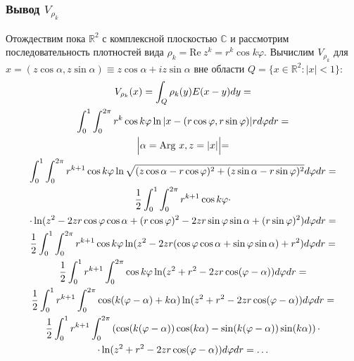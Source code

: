 \documentclass[a4paper]{article}
\newcommand{\R}[1]{\mathbb{R}^#1}
\begin{document}
  \subsubsection{Вывод $V_{\rho_k}$}
  Отождествим пока $\R{2}$ с комплексной плоскостью $\mathbb{C}$ и рассмотрим последовательность плотностей вида $\rho_k=\text{Re}\ z^k=r^k \cos k\varphi$.
  Вычислим $V_{\rho_k}$ для $x=(z \cos\alpha,z \sin \alpha) \equiv z \cos\alpha + i z \sin \alpha$ вне области $Q= \{x \in \R{2}: |x|<1 \}$:
\begin{multline}
  V_{\rho_k}(x)= \int_Q \rho_k(y) E(x-y) dy= \\
  \int_0^1 \int_0^{2 \pi} r^k \cos k\varphi \ln |x-(r \cos \varphi, r \sin\varphi)| r d\varphi dr =\\
  \Bigl|\alpha = \text{Arg}\ x, z=|x| \Bigl|=\\
  \int_0^1 \int_0^{2 \pi} r^{k+1} \cos k\varphi \ln \sqrt{(z\cos \alpha-r \cos \varphi)^2+(z\sin \alpha-r \sin\varphi)^2} d\varphi dr=\\
  \frac{1}{2} \int_0^1 \int_0^{2 \pi} r^{k+1} \cos k\varphi \cdot \\
  \cdot \ln(z^2 - 2z r \cos\varphi \cos \alpha +(r \cos \varphi)^2 - 2z r \sin \varphi \sin \alpha +(r \sin \varphi)^2) d\varphi dr =\\
  \frac{1}{2} \int_0^1 \int_0^{2 \pi} r^{k+1} \cos k\varphi \ln(z^2-2zr(\cos \varphi \cos \alpha + \sin \varphi \sin \alpha)+r^{2})d\varphi dr=\\
  \frac{1}{2} \int_0^1 r^{k+1}\int_0^{2 \pi}  \cos k\varphi \ln(z^2 + r^{2} - 2zr \cos (\varphi -\alpha)) d\varphi dr=\\
  \frac{1}{2} \int_0^1 r^{k+1}\int_0^{2 \pi}\cos (k(\varphi -\alpha)+k\alpha)\ln(z^2 + r^{2} - 2zr \cos (\varphi -\alpha)) d\varphi dr= \\
  \frac{1}{2} \int_0^1 r^{k+1}\int_0^{2 \pi}\left(\cos (k(\varphi -\alpha)) \cos(k\alpha) - \sin (k(\varphi -\alpha)) \sin(k\alpha)\right) \cdot \\
  \cdot \ln(z^2 + r^{2} - 2zr \cos (\varphi -\alpha)) d\varphi dr=\dots
\end{multline}
\end{document}
